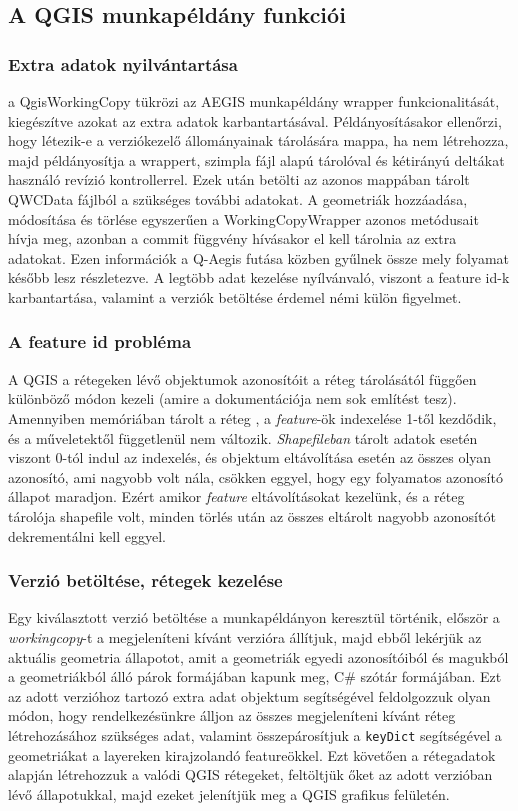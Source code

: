 \subsection{A QGIS munkapéldány funkciói}
\subsubsection{Extra adatok nyilvántartása}
a QgisWorkingCopy tükrözi az AEGIS munkapéldány wrapper funkcionalitását, kiegészítve azokat az extra adatok karbantartásával. Példányosításakor ellenőrzi, hogy létezik-e a verziókezelő állományainak tárolására mappa, ha nem létrehozza, majd példányosítja a wrappert, szimpla fájl alapú tárolóval és kétirányú deltákat használó revízió kontrollerrel. Ezek után betölti az azonos mappában tárolt QWCData fájlból a szükséges további adatokat.
A geometriák hozzáadása, módosítása és törlése egyszerűen a WorkingCopyWrapper azonos metódusait hívja meg, azonban a commit függvény hívásakor el kell tárolnia az extra adatokat. Ezen információk a Q-Aegis futása közben gyűlnek össze mely folyamat később lesz részletezve. A legtöbb adat kezelése nyílvánvaló, viszont a feature id-k karbantartása, valamint a verziók betöltése érdemel némi külön figyelmet.
\subsubsection{A feature id probléma}
A QGIS a rétegeken lévő objektumok azonosítóit a réteg tárolásától függően különböző módon kezeli (amire a dokumentációja nem sok említést tesz). Amennyiben memóriában tárolt a réteg , a \textit{feature}-ök indexelése 1-től kezdődik, és a műveletektől függetlenül nem változik. \textit{Shapefileban} tárolt adatok esetén viszont 0-tól indul az indexelés, és objektum eltávolítása esetén az összes olyan azonosító, ami nagyobb volt nála, csökken eggyel, hogy egy folyamatos azonosító állapot maradjon. Ezért amikor \textit{feature} eltávolításokat kezelünk, és a réteg tárolója shapefile volt, minden törlés után az összes eltárolt nagyobb azonosítót dekrementálni kell eggyel.
\subsubsection{Verzió betöltése, rétegek kezelése}
Egy kiválasztott verzió betöltése a munkapéldányon keresztül történik, először a \textit{workingcopy}-t a megjeleníteni kívánt verzióra állítjuk, majd ebből lekérjük az aktuális geometria állapotot, amit a geometriák egyedi azonosítóiból és magukból a geometriákból álló párok formájában kapunk meg, C\# szótár formájában. Ezt az adott verzióhoz tartozó extra adat objektum segítségével feldolgozzuk olyan módon, hogy rendelkezésünkre álljon az összes megjeleníteni kívánt réteg létrehozásához szükséges adat, valamint összepárosítjuk a \texttt{keyDict} segítségével a geometriákat a layereken kirajzolandó featureökkel. Ezt követően a rétegadatok alapján létrehozzuk a valódi QGIS rétegeket, feltöltjük őket az adott verzióban lévő állapotukkal, majd ezeket jelenítjük meg a QGIS grafikus felületén.

